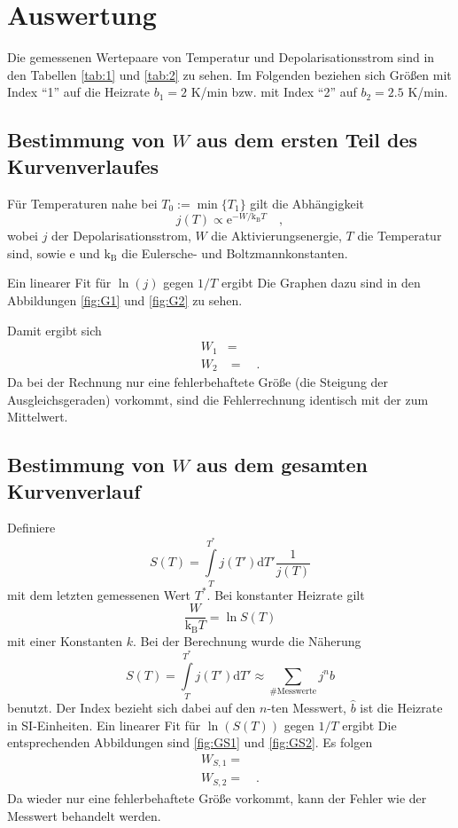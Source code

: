\section{Auswertung}
Die gemessenen Wertepaare von Temperatur und Depolarisationsstrom sind in den 
Tabellen \ref{tab:1} und \ref{tab:2} zu sehen. Im Folgenden beziehen sich Größen mit
Index "`1"' auf die Heizrate $b_1=2$ K/min bzw. mit Index "`2"' auf $b_2=2.5$ 
K/min.

%
%
%
%
\subsection{Bestimmung von $W$ aus dem ersten Teil des Kurvenverlaufes}
Für Temperaturen nahe bei $T_0:=\min\{T_1\}$ gilt die Abhängigkeit
\begin{equation}
j(T)\propto \text{e}^{-W/\text{k}_\text{B}T} \quad ,
\end{equation}
wobei $j$ der Depolarisationsstrom, $W$ die Aktivierungsenergie, $T$ die 
Temperatur sind, sowie $\text{e}$ und $\text{k}_\text{B}$ die Eulersche- und 
Boltzmannkonstanten.

Ein linearer Fit für $\ln(j)$ gegen $1/T$ ergibt
%
%
Die Graphen dazu sind in den Abbildungen \ref{fig:G1} und \ref{fig:G2} zu sehen.

Damit ergibt sich
\begin{align}
W_1&= \\
W_2&=   \quad .
\end{align}
Da bei der Rechnung nur eine fehlerbehaftete Größe (die Steigung der 
Ausgleichsgeraden) vorkommt, sind die Fehlerrechnung identisch mit der 
zum Mittelwert.
\subsection{Bestimmung von $W$ aus dem gesamten Kurvenverlauf}
Definiere 
\begin{equation}
S(T)=\int\limits_T^{T^*} j(T') \text{d}T' \frac{1}{j(T)}
\end{equation}
mit dem letzten gemessenen Wert $T^*$.
Bei konstanter Heizrate gilt
\begin{equation}
\frac{W}{\text{k}_\text{B} T}=\ln S(T)
\end{equation}
mit einer Konstanten $k$. Bei der Berechnung wurde die Näherung 
\begin{equation}
S(T)=\int\limits_T^{T^*} j(T') \text{d}T' \approx \sum\limits_{\#\text{Messwerte}} j^n  \hat{b}
\end{equation}
benutzt. Der Index bezieht sich dabei auf den $n$-ten Messwert, $\hat{b}$ ist die 
Heizrate in SI-Einheiten. Ein linearer Fit für $\ln(S(T))$ gegen $1/T$ ergibt 
%
%
Die entsprechenden Abbildungen sind \ref{fig:GS1} und \ref{fig:GS2}.
Es folgen
\begin{align}
W_{S,1}=  \\
W_{S,2}=   \quad .
\end{align}
Da wieder nur eine fehlerbehaftete Größe vorkommt, kann der Fehler wie der 
Messwert behandelt werden.

